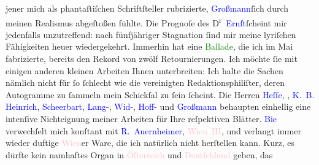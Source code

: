 \documentclass[twoside=false,titlepage=false,open=any, parskip=never, fontsize=12pt, headings=small, chapterprefix=false, appendixprefix=false]{scrbook}
\newcommand{\Theight}{\dimexpr\fontcharht\font`W}
\newcommand{\pbposition}{\depth}
\newcommand{\pb}{\nobreak\hspace{0pt}\raisebox{-0.1em}{\raisebox{\pbposition}{\textnormal{|}}}\nobreak\hspace{0pt}}
\newcommand{\introOben}{\textnormal{\raisebox{\Theight}{\raisebox{-\height}{\small{v}\normalsize}}}}
\begin{document}
                    jener mich als phantaſtiſchen Schriftſteller rubrizierte, \textcolor{blue}{Großmann}{}\ledrightnote{\textcolor{blue}{Stefan Großmann}}{ }ſich durch meinen Realismus abgeſtoßen fühlte.
                    Die Prognoſe des D\textsuperscript{r} \textcolor{blue}{Ernſt}{}\ledrightnote{\textcolor{blue}{Paul Ernst}}{ }ſcheint mir \introOben{}jedenfalls\introOben{} unzutreffend: nach fünfjähriger Stagnation ſind mir meine
                    lyriſchen Fähigkeiten heuer wiedergekehrt. Immerhin hat eine \textcolor{green}{Ballade}{}, die ich im Mai
                    fabrizierte, bereits den Rekord von zwölf Retournierungen. Ich möchte ſie mit
                    einigen anderen kleinen Arbeiten {\pb}Ihnen unterbreiten: Ich halte die Sachen nämlich nicht für ſo ſchlecht wie die
                    vereinigten Redaktionsphiliſter, deren Autogramme zu ſammeln mein Schickſal zu
                    ſein ſcheint. Die Herren \textcolor{blue}{Heſſe}{}\ledrightnote{\textcolor{blue}{Hermann Hesse}}, \label{K_L01946_3v}\label{K_L01946_3h}, \textcolor{blue}{K. B. Heinrich}{}\ledrightnote{\textcolor{blue}{Karl Borromäus Heinrich}},
                        \textcolor{blue}{Scheerbart}{}\ledrightnote{\textcolor{blue}{Paul Scheerbart}}, \textcolor{blue}{Lang-}{}\ledrightnote{\textcolor{blue}{Philipp Langmann}}, \textcolor{blue}{Wid-}{}\ledrightnote{\textcolor{blue}{Joseph Victor Widmann}}, \textcolor{blue}{Hoff-}{}\ledrightnote{\textcolor{blue}{Camill Hoffmann}} und \textcolor{blue}{Großmann}{}\ledrightnote{\textcolor{blue}{Stefan Großmann}}
                    behaupten einhellig eine intenſive Nichteignung meiner Arbeiten für Ihre
                    reſpektiven Blätter. \textcolor{blue}{Bie}{}\ledrightnote{\textcolor{blue}{Oskar Bie}} verwechſelt mich
                    konſtant mit \textcolor{blue}{R. Auernheimer}{}\ledrightnote{\textcolor{blue}{Raoul Auernheimer}}, \textcolor{pink}{Wien III}{}\ledrightnote{\textcolor{pink}{III., Landstraße}}, und verlangt immer wieder duftige \textcolor{pink}{Wien}{}\ledrightnote{\textcolor{pink}{Wien}}er Ware, die ich natürlich nicht herſtellen kann.
                    Kurz, es dürfte kein namhaftes Organ in \textcolor{pink}{Öſterreich}{}\ledrightnote{\textcolor{pink}{Österreich}} und \textcolor{pink}{Deutſchland}{}\ledrightnote{\textcolor{pink}{Deutschland}} geben, das
\end{document}
